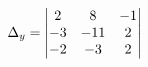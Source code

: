 \documentclass[preview]{standalone}
\begin{document}
\begin{align*}
\special{dvisvgm:raw <g id='unique000'>}\Delta_y = \begin{vmatrix} 2 & 8 & -1 \\ -3 & -11 & 2 \\ -2 & -3 & 2 \end{vmatrix}\special{dvisvgm:raw </g>}
\end{align*}
\end{document}
